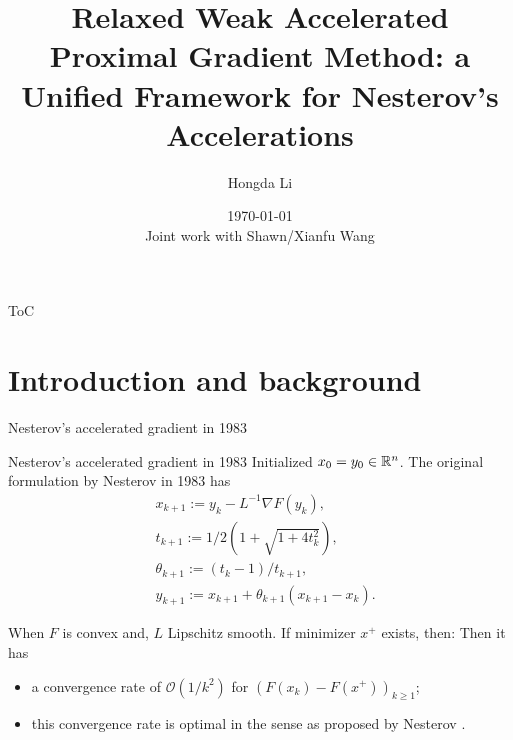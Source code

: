 \documentclass[11pt]{beamer}
\author[Hongda Li]{Hongda Li}
\title{
    Relaxed Weak Accelerated Proximal Gradient Method: a Unified Framework for Nesterov's Accelerations
}
\institute[UBCO]{
    University of British Columbia Okanagan
}
\date[\today]{\today \\ \vspace{1cm} \tiny{Joint work with Shawn/Xianfu Wang}}
\theoremstyle{definition}
\begin{document}
\begin{frame}
    \titlepage
\end{frame}

\begin{frame}{ToC}
    \tableofcontents
\end{frame}

\section{Introduction and background}
    \begin{frame}{Nesterov's accelerated gradient in 1983}
        \begin{block}{Nesterov's accelerated gradient in 1983}
            Initialized $x_0 = y_0 \in \mathbb R^n$. 
            The original formulation by Nesterov in 1983 \cite{nesterov_method_1983} has
            {\small
            \begin{align*}
                & x_{k + 1} := y_k - L^{-1}\nabla F(y_k),
                \\
                & t_{k + 1} := 1/2\left(1 + \sqrt{1 + 4t_{k}^2}\right),
                \\
                & \theta_{k + 1} := (t_{k} - 1)/t_{k + 1}, \label{eqn:example-algorithm}
                \\
                & y_{k + 1} := x_{k + 1} + \theta_{k + 1}(x_{k + 1} - x_k).
            \end{align*}    
            }
        \end{block}
        When $F$ is convex and, $L$ Lipschitz smooth. 
        If minimizer $x^+$ exists, then: 
        Then it has
        \begin{itemize}
            \item a convergence rate of $\mathcal O(1/k^2)$ for $(F(x_k) - F(x^+))_{k \ge 1}$;
            \item this convergence rate is optimal in the sense as proposed by Nesterov \cite{nesterov_lectures_2018}.
        \end{itemize}
    \end{frame}
\end{document}
